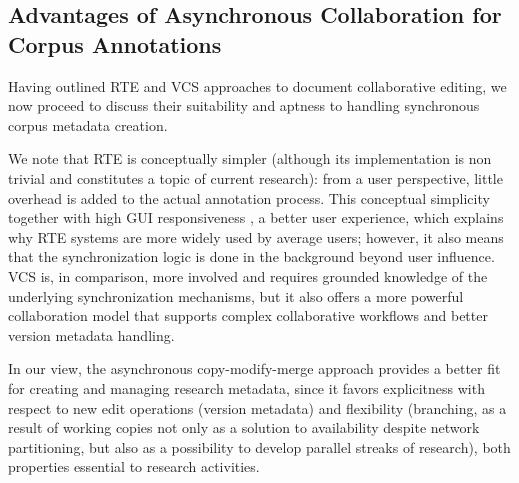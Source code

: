 \documentclass{sig-alternate}
\begin{document}

\subsection{Advantages of Asynchronous Collaboration for Corpus Annotations}
\label{subsec:hybrid}

Having outlined RTE and VCS approaches to document collaborative editing, we now proceed to discuss
their suitability and aptness to handling synchronous corpus metadata creation.

We note that RTE is conceptually simpler (although its implementation is non trivial and 
constitutes a topic of current research): from a user perspective, little overhead is added to
the actual annotation process.
This conceptual simplicity \textemdash together with high GUI responsiveness \textemdash,
a better user experience, which explains why RTE systems are more widely used by average users;
however, it also means that the synchronization logic is done in the background beyond user
influence.
VCS is, in comparison, more involved and requires grounded knowledge of the underlying
synchronization mechanisms, but it also offers a more powerful collaboration model that
supports complex collaborative workflows and better version metadata handling.

In our view, the asynchronous copy-modify-merge approach provides a
better fit for creating and managing research metadata, since it favors explicitness with
respect to new edit operations (version metadata) and flexibility (branching, as a result of
working copies not only as a solution to availability despite network
partitioning, but also as a possibility to develop parallel streaks of research),
both properties essential to research activities.

\end{document}
